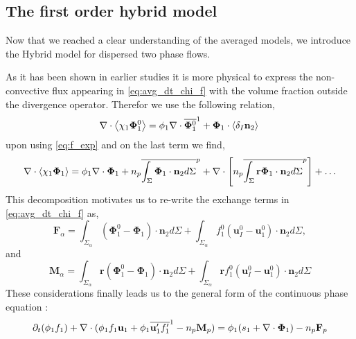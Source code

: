 \subsection{The first order hybrid model}

Now that we reached a clear understanding of the averaged models, we introduce the Hybrid model for dispersed two phase flows. 

As it has been shown in earlier studies \citep{jackson2000dynamics} it is more physical to express the non-convective flux appearing in \ref{eq:avg_dt_chi_f} with the volume fraction outside the divergence operator. 
Therefor we use the following relation, 
\begin{equation*}
    \mathbf{\nabla}\cdot \left<\chi_1 \mathbf{\Phi}_1^0\right>
    = \phi_1 \mathbf{\nabla}\cdot  \overline{ \mathbf{\Phi}_1^0}^1
    +  \mathbf{\Phi}_1 \cdot \left<\delta_I \textbf{n}_2\right>\\
\end{equation*}
upon using \ref{eq:f_exp} and on the last term we find, 
\begin{equation}
    \mathbf{\nabla}\cdot \left<\chi_1 \mathbf{\Phi}_1\right>
    =  \phi_1 \mathbf{\nabla}\cdot  \mathbf{\Phi}_1
    + n_p\overline{\int_{\Sigma} \mathbf{\Phi}_1 \cdot  \textbf{n}_2 d\Sigma}^{p}
    +\mathbf{\nabla}\cdot \left[
        n_p\overline{\int_{\Sigma} \textbf{r}\mathbf{\Phi}_1 \cdot  \textbf{n}_2 d\Sigma}^{p}
    \right] 
    +\ldots
\end{equation}
This decomposition motivates us to re-write the exchange terms in \ref{eq:avg_dt_chi_f} as, 
\begin{equation*}
    \textbf{F}_\alpha = 
    \int_{\Sigma_\alpha}
    \left(
        \mathbf{\Phi}_1^0 
        - \mathbf{\Phi}_1
    \right)  
    \cdot \textbf{n}_2d\Sigma
    + 
    \int_{\Sigma_\alpha}f_1^0
    \left(
        \textbf{u}_I^0
        - \textbf{u}_1^0
    \right)
    \cdot \textbf{n}_2d\Sigma,
\end{equation*}
and 
\begin{equation*}
    \textbf{M}_\alpha = \int_{\Sigma_\alpha} \textbf{r}
        \left(\mathbf{\Phi}_1^0- \mathbf{\Phi}_1\right)\cdot \textbf{n}_2d\Sigma
        + \int_{\Sigma_\alpha} \textbf{r}f_1^0
        \left(
            \textbf{u}_I^0
            - \textbf{u}_1^0
        \right)
    \cdot \textbf{n}_2d\Sigma
\end{equation*}
These considerations finally leads us to the general form of the continuous phase equation : 
\begin{equation}
    \partial_t (\phi_1 f_1)
    + \mathbf{\nabla}\cdot (\phi_1 f_1\textbf{u}_1
    + \phi_1 \overline{\textbf{u}_1'f_1'}^1
    - n_p \textbf{M}_p )
    = 
    \phi_1(s_1  +\mathbf{\nabla}\cdot \mathbf{\Phi}_1)
    - n_p \textbf{F}_p
    \label{eq:hybrid_avg_dt_chif}
\end{equation}

